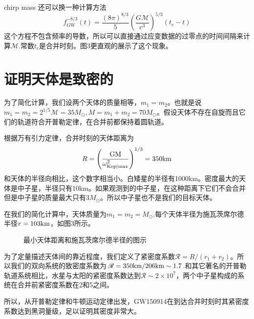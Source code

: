 \documentclass[UTF8]{ctexart}
\begin{document}
chirp mass 还可以换一种计算方法
\begin{equation}
f_{\mathrm{GW}}^{-8 / 3}(t)=\frac{(8 \pi)^{8 / 3}}{5}\left(\frac{G \mathscr{M}}{c^{3}}\right)^{5 / 3}\left(t_{c}-t\right)
\end{equation}
这个方程不包含频率的导数，所以可以直接通过应变数据的过零点的时间间隔来计算$\mathscr{M}$.常数$t_c$是合并时刻。图3更直观的展示了这个现象。

\section{证明天体是致密的}
为了简化计算，我们设两个天体的质量相等，$m_1=m_2$。也就是说$m_1=m_2=2^{1/5}\mathscr{M}=35M_\odot,M=m_1+m_2=70M_\odot$。假设天体不存在自旋而且它们的轨道符合开普勒定律，在合并前都保持着圆轨道。

根据万有引力定律，合并时刻的天体距离为
\begin{equation}
R = \left(\frac{\rm GM}{\omega^2_{\rm Kep|max}}\right)^{1/3} = 350{\rm km}
\end{equation}
和天体的半径向相比，这个数字相当小。白矮星的半径有1000km。密度最大的天体是中子星，半径只有10km。如果观测到的中子星，在这种距离下它们不会合并但是中子星的质量最大只有$3M_\odot$。所以中子星也不是我们的目标天体。

在我们的简化计算中，天体质量为$m_1=m_2=M_\odot$.每个天体半径为施瓦茨席尔德半径$r = 103{\rm km}$，如图3所示。
\begin{figure}[!htbp]
	\centering
	\caption{最小天体距离和施瓦茨席尔德半径的图示}
\end{figure}

为了定量描述天体间的靠近程度，我们定义了紧密度系数$\mathscr{R}=R/(r_1+r_2)$。所以我们的双向系统的致密度系数为$\mathscr{R}=350{\rm km}/206{\rm km} \sim 1.7$.和其它著名的开普勒轨道系统相比，水星与太阳的紧密度系数达到$\mathscr{R}\sim 2\times 10^7$，两个中子星构成的系统在合并前紧密度系数在2和5之间。

所以，从开普勒定律和牛顿运动定律出发，GW150914在到达合并时刻时其紧密度系数达到黑洞量级，足以证明其密度非常大。
\end{document}
